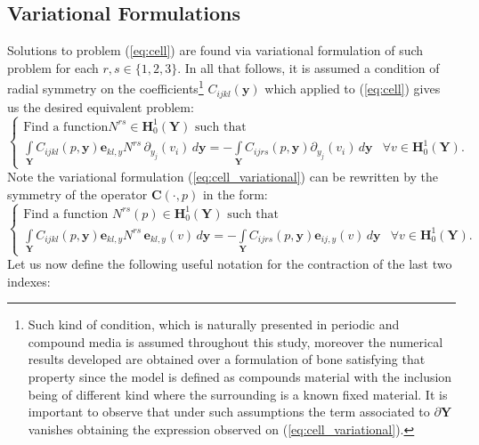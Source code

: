 \subsection{Variational Formulations}
Solutions to problem (\ref{eq:cell}) are found via variational formulation of such problem for each $r,s \in \{1,2,3\}$. In all that follows, it is assumed a condition of radial symmetry on the coefficients\footnote{Such kind of condition, which is naturally presented in periodic and compound media is assumed throughout this study, moreover the numerical results developed are obtained over a formulation of bone satisfying that property since the model is defined as compounds material with the inclusion being of different kind where the surrounding is a known fixed material. It is important to observe that under such assumptions the term associated to $\partial \mathbf{Y}$ vanishes obtaining the expression observed on (\ref{eq:cell_variational}).} $C_{ijkl}(\mathbf{y})$ which applied to (\ref{eq:cell}) gives us the desired equivalent problem:
\begin{equation}
    \label{eq:cell_variational}
    \left \{
    \begin{array}{cc}
        \text{Find a function} N^{rs} \in \mathbf{H}^1_{0}(\mathbf{Y}) \text{ such that } & \quad \\
        \int\limits_{\mathbf{Y}} C_{ijkl}(p,\mathbf{y})\mathbf{e}_{kl,y} N^{rs} \, \partial_{y_j}(v_i)\,d\mathbf{y} = -\int\limits_{\mathbf{Y}} C_{ijrs}(p, \mathbf{y}) \partial_{y_j}(v_i)\,d\mathbf{y} &  \forall v \in \mathbf{H}^1_{0}(\mathbf{Y}).
    \end{array}
    \right.
\end{equation}
Note the variational formulation (\ref{eq:cell_variational}) can be rewritten by the symmetry of the operator $\mathbf{C}(\cdot,p)$ in the form:
\begin{equation}
    \label{eq:cell_symmetric}
    \left \{
    \begin{array}{cc}
        \text{Find a function } N^{rs}(p) \in \mathbf{H}^1_{0}(\mathbf{Y}) \text{ such that } & \quad\\
        \int\limits_{\mathbf{Y}} C_{ijkl}(p,\mathbf{y})\mathbf{e}_{kl,y} N^{rs}\, \mathbf{e}_{kl,y}(v)\,d\mathbf{y} = -\int\limits_{\mathbf{Y}} C_{ijrs}(p,\mathbf{y}) \mathbf{e}_{ij,y}(v)\,d\mathbf{y} &\forall v \in \mathbf{H}^1_{0}(\mathbf{Y}).
    \end{array}
    \right.
\end{equation}
Let us now define the following useful notation for the contraction of the last two indexes:
